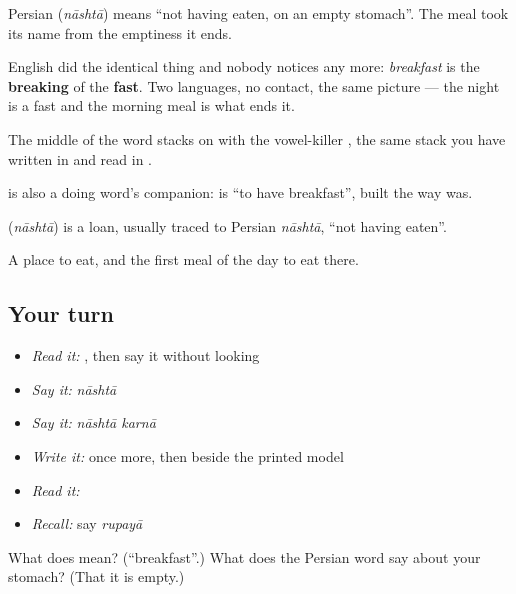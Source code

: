 Persian  (\emph{nāshtā}) means \textquotedblleft{}not having eaten, on an empty stomach\textquotedblright{}. The meal took its name from the emptiness it ends.

English did the identical thing and nobody notices any more: \emph{breakfast} is the \textbf{breaking} of the \textbf{fast}. Two languages, no contact, the same picture — the night is a fast and the morning meal is what ends it.

The middle of the word stacks  on  with the vowel-killer , the same stack you have written in \textbf{} and read in \textbf{}.

\textbf{} is also a doing word's companion: \textbf{ } is \textquotedblleft{}to have breakfast\textquotedblright{}, built the way \textbf{ } was.

\begin{cousinweb}
\textbf{} (\emph{nāshtā}) is a loan, usually traced to Persian \emph{nāshtā}, \textquotedblleft{}not having eaten\textquotedblright{}.
\end{cousinweb}

\begin{grammarlens}[title={What you've built}]
A place to eat, and the first meal of the day to eat there.
\end{grammarlens}

\subsection*{Your turn}
\begin{itemize}
\raggedright
  \item \emph{Read it:} \textbf{}, then say it without looking
  \item \emph{Say it:} \emph{nāshtā}
  \item \emph{Say it:} \emph{nāshtā karnā}
  \item \emph{Write it:}  once more, then  beside the printed model
  \item \emph{Read it:} \textbf{}
  \item \emph{Recall:} say \emph{rupayā}
\end{itemize}

\begin{tcolorbox}[breakable,colback=teal!4,colframe=teal!35!black,title={Before you move on}]
What does  mean? (\textquotedblleft{}breakfast\textquotedblright{}.) What does the Persian word say about your stomach? (That it is empty.)
\end{tcolorbox}
